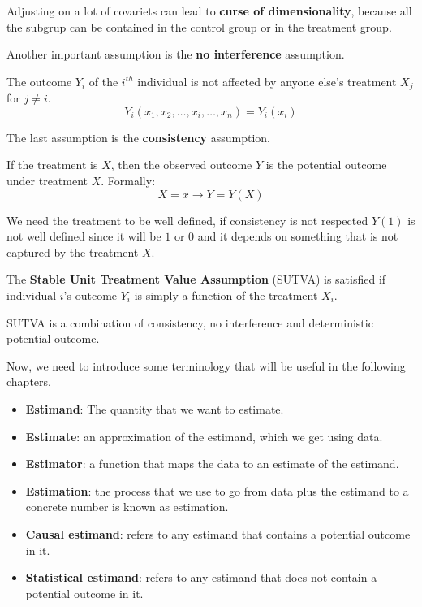 Adjusting on a lot of covariets can lead to \textbf{curse of dimensionality}, because 
all the subgrup can be contained in the control group or in the treatment group. 

Another important assumption is the \textbf{no interference} assumption.
\begin{definition}[No interference]
    The outcome $Y_i$ of the $i^{th}$ individual is not affected by anyone else's
    treatment $X_j$ for $j \neq i$.
    \begin{equation}
        Y_i(x_1, x_2, \ldots, x_i, \ldots, x_n) = Y_i(x_i)
    \end{equation}
\end{definition}

The last assumption is the \textbf{consistency} assumption.
\begin{definition}[Consistency]
    If the treatment is $X$, then the observed outcome $Y$ is the potential outcome
    under treatment $X$. Formally:
    \begin{equation}
        X = x \rightarrow Y = Y(X)
    \end{equation}
\end{definition}

We need the treatment to be well defined, if consistency is not respected $Y(1)$ 
is not well defined since it will be $1$ or $0$ and it depends on something that 
is not captured  by the treatment $X$.

\begin{definition}
    The \textbf{Stable Unit Treatment Value Assumption} (SUTVA) is satisfied if
    individual $i$'s outcome $Y_i$ is simply a function of the treatment $X_i$.
\end{definition}

SUTVA is a combination of consistency, no interference and deterministic potential 
outcome.

Now, we need to introduce some terminology that will be useful in the following
chapters.
\begin{itemize}
    \item \textbf{Estimand}: The quantity that we want to estimate.
    \item \textbf{Estimate}: an approximation of the estimand, which we get
          using data.
    \item \textbf{Estimator}: a function that maps the data to an estimate of the
          estimand.
    \item \textbf{Estimation}: the process that we use to go from data plus the
          estimand to a concrete number is known as estimation.
    \item \textbf{Causal estimand}: refers to any estimand that contains a potential
          outcome in it.
    \item \textbf{Statistical estimand}: refers to any estimand that does not contain
          a potential outcome in it.
\end{itemize}

